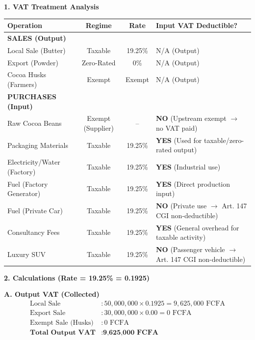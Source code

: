 \documentclass[11pt]{article}
\begin{document}
\begin{exoresolu}
\textbf{1. VAT Treatment Analysis}

\begin{center}
\begin{tabularx}{\linewidth}{|l|c|c|X|}
\hline
\rowcolor{popblueL} \textbf{Operation} & \textbf{Regime} & \textbf{Rate} & \textbf{Input VAT Deductible?} \\
\hline
\textbf{SALES (Output)} & & & \\
Local Sale (Butter) & Taxable & 19.25\% & N/A (Output) \\
Export (Powder) & Zero-Rated & 0\% & N/A (Output) \\
Cocoa Husks (Farmers) & Exempt & Exempt & N/A (Output) \\
\hline
\textbf{PURCHASES (Input)} & & & \\
Raw Cocoa Beans & Exempt (Supplier) & -- & \textbf{NO} (Upstream exempt $\rightarrow$ no VAT paid) \\
Packaging Materials & Taxable & 19.25\% & \textbf{YES} (Used for taxable/zero-rated output) \\
Electricity/Water (Factory) & Taxable & 19.25\% & \textbf{YES} (Industrial use) \\
Fuel (Factory Generator) & Taxable & 19.25\% & \textbf{YES} (Direct production input) \\
Fuel (Private Car) & Taxable & 19.25\% & \textbf{NO} (Private use $\rightarrow$ Art. 147 CGI non-deductible) \\
Consultancy Fees & Taxable & 19.25\% & \textbf{YES} (General overhead for taxable activity) \\
Luxury SUV & Taxable & 19.25\% & \textbf{NO} (Passenger vehicle $\rightarrow$ Art. 147 CGI non-deductible) \\
\hline
\end{tabularx}
\end{center}

\textbf{2. Calculations (Rate = 19.25\% = 0.1925)}

\textbf{A. Output VAT (Collected)}
\begin{align*}
\text{Local Sale} &: 50,000,000 \times 0.1925 = 9,625,000 \text{ FCFA} \\
\text{Export Sale} &: 30,000,000 \times 0.00 = 0 \text{ FCFA} \\
\text{Exempt Sale (Husks)} &: 0 \text{ FCFA} \\
\textbf{Total Output VAT} &: \textbf{9,625,000 FCFA}
\end{align*}


\end{exoresolu}
\end{document}
